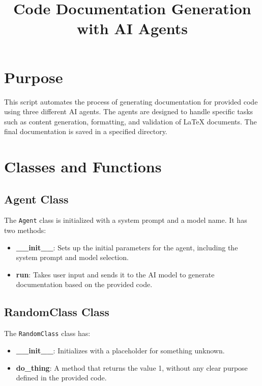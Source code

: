 \documentclass{article}
\begin{document}
\title{Code Documentation Generation with AI Agents}
\author{}
\date{}
\maketitle

\section*{Purpose}
This script automates the process of generating documentation for provided code using three different AI agents. The agents are designed to handle specific tasks such as content generation, formatting, and validation of LaTeX documents. The final documentation is saved in a specified directory.

\section{Classes and Functions}

\subsection{Agent Class}
The \texttt{Agent} class is initialized with a system prompt and a model name. It has two methods: 
\begin{itemize}
    \item \textbf{\_\_init\_\_}: Sets up the initial parameters for the agent, including the system prompt and model selection.
    \item \textbf{run}: Takes user input and sends it to the AI model to generate documentation based on the provided code.
\end{itemize}

\subsection{RandomClass Class}
The \texttt{RandomClass} class has:
\begin{itemize}
    \item \textbf{\_\_init\_\_}: Initializes with a placeholder for something unknown.
    \item \textbf{do\_thing}: A method that returns the value 1, without any clear purpose defined in the provided code.
\end{itemize}
\end{document}
